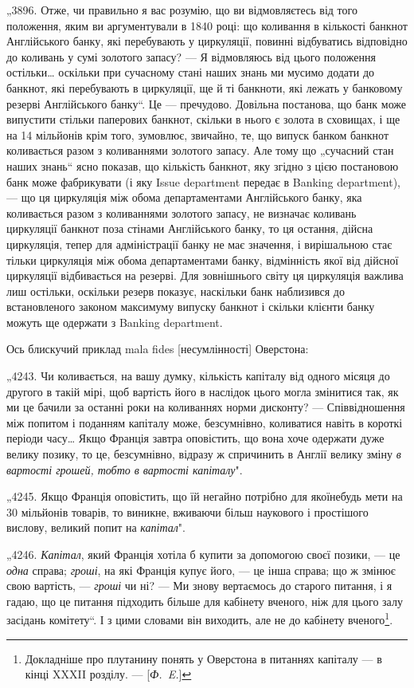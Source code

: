 
„3896. Отже, чи правильно я вас розумію, що ви відмовляєтесь
від того положення, яким ви аргументували в 1840 році: що коливання в кількості банкнот Англійського
банку, які перебувають
у циркуляції, повинні відбуватись відповідно до коливань у сумі
золотого запасу? — Я відмовляюсь від цього положення остільки\dots{}
оскільки при сучасному стані наших знань ми мусимо додати до
банкнот, які перебувають в циркуляції, ще й ті банкноти, які
лежать у банковому резерві Англійського банку“. Це — пречудово. Довільна постанова, що банк може
випустити стільки
паперових банкнот, скільки в нього є золота в сховищах, і ще на
14 мільйонів крім того, зумовлює, звичайно, те, що випуск банком
банкнот коливається разом з коливаннями золотого запасу. Але
тому що „сучасний стан наших знань“ ясно показав, що кількість
банкнот, яку згідно з цією постановою банк може фабрикувати (і яку
Issue department передає в Banking department), — що ця циркуляція
між обома департаментами Англійського банку, яка коливається
разом з коливаннями золотого запасу, не визначає коливань
циркуляції банкнот поза стінами Англійського банку, то ця
остання, дійсна циркуляція, тепер для адміністрації банку не має
значення, і вирішальною стає тільки циркуляція між обома
департаментами банку, відмінність якої від дійсної циркуляції
відбивається на резерві. Для зовнішнього світу ця циркуляція
важлива лиш остільки, оскільки резерв показує, наскільки банк
наблизився до встановленого законом максимуму випуску банкнот і
скільки клієнти банку можуть ще одержати з Banking department.

Ось блискучий приклад mala fides [несумлінності] Оверстона:

„4243. Чи коливається, на вашу думку, кількість капіталу від
одного місяця до другого в такій мірі, щоб вартість його в наслідок цього могла змінитися так, як ми
це бачили за
останні роки на коливаннях норми дисконту? — Співвідношення
між попитом і поданням капіталу може, безсумнівно, коливатися навіть в короткі періоди часу\dots{} Якщо
Франція завтра оповістить, що вона хоче одержати дуже велику позику, то це, безсумнівно, відразу ж
спричинить в Англії велику зміну \emph{в вартості грошей, тобто в вартості капіталу}".

„4245. Якщо Франція оповістить, що їй негайно потрібно для
якоїнебудь мети на 30 мільйонів товарів, то виникне, вживаючи
більш наукового і простішого вислову, великий попит на \emph{капітал}".

„4246. \emph{Капітал}, який Франція хотіла б купити за допомогою
своєї позики, — це \emph{одна} справа; \emph{гроші}, на які Франція купує його, — це інша справа; що ж змінює свою
вартість, — \emph{гроші} чи ні? — Ми знову вертаємось до старого питання, і я гадаю, що це питання
підходить більше для кабінету вченого, ніж для цього залу засідань комітету“. І з цими словами він
виходить, але не
до кабінету вченого\footnote{
Докладніше про плутанину понять у Оверстона в питаннях капіталу — в кінці XXXII розділу. — [\emph{Ф.~E.}]
}.
